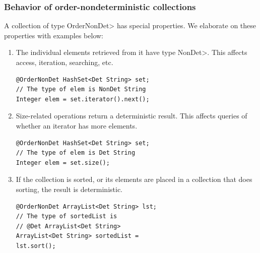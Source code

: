 \subsubsection{Behavior of order-nondeterministic collections}\label{sec:ond-behavior}
A collection of type \<OrderNonDet> has special properties. We elaborate on these properties
with examples below:

\begin{enumerate}
    \item
    The individual elements retrieved from it have type \<NonDet>.  This
    affects access, iteration, searching, etc.
    \begin{verbatim}
@OrderNonDet HashSet<Det String> set; 
// The type of elem is NonDet String
Integer elem = set.iterator().next();
    \end{verbatim}
    \vspace{-0.4cm}
    \item
    Size-related operations return a deterministic result.  This affects
    queries of whether an iterator has more elements.
    \begin{verbatim}
@OrderNonDet HashSet<Det String> set; 
// The type of elem is Det String
Integer elem = set.size();
    \end{verbatim}
    \vspace{-0.4cm}
    \item
    If the collection is sorted, or its elements are placed in a collection
    that does sorting, the result is deterministic.
    \begin{verbatim}
@OrderNonDet ArrayList<Det String> lst; 
// The type of sortedList is 
// @Det ArrayList<Det String>
ArrayList<Det String> sortedList = 
lst.sort();
    \end{verbatim}
    \vspace{-0.4cm}
\end{enumerate}

